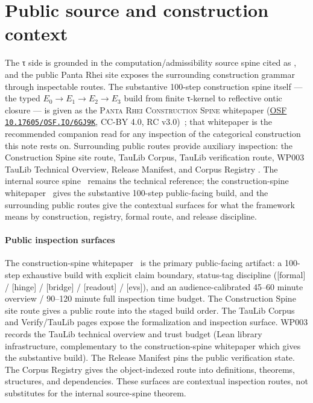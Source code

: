 \documentclass{pantarhei-researchnote}
\newcommand{\Ezero}{\ensuremath{E_0}}
\newcommand{\Eone}{\ensuremath{E_1}}
\newcommand{\Etwo}{\ensuremath{E_2}}
\newcommand{\Ethree}{\ensuremath{E_3}}
\begin{document}
\section{Public source and construction context}
\label{sec:public-context}

The τ side is grounded in the computation/admissibility source spine
cited as \cite{PR-III}, and the public Panta Rhei site exposes the
surrounding construction grammar through inspectable routes. The
substantive 100-step construction spine itself --- the typed
$\Ezero\to\Eone\to\Etwo\to\Ethree$ build from finite τ-kernel to
reflective ontic closure --- is given as the
\textsc{Panta Rhei Construction Spine} whitepaper
(\href{https://doi.org/10.17605/OSF.IO/6GJ9K}{OSF
\texttt{10.17605/OSF.IO/6GJ9K}}, CC-BY 4.0,
RC v3.0)~\cite{PR-ConstructionSpineWhitepaper}; that whitepaper is the
recommended companion read for any inspection of the categorical
construction this note rests on. Surrounding public routes provide
auxiliary inspection: the Construction Spine site route, TauLib Corpus,
TauLib verification route, WP003 TauLib Technical Overview, Release
Manifest, and Corpus Registry
\cite{PR-ConstructionSpinePublic,PR-TauLibCorpusPublic,PR-TauLibVerifyPublic,PR-TauLibWhitePaperPublic,PR-ReleaseManifestPublic,PR-RegistryPublic}.
The internal source spine~\cite{PR-III} remains the technical reference;
the construction-spine whitepaper~\cite{PR-ConstructionSpineWhitepaper}
gives the substantive 100-step public-facing build, and the surrounding
public routes give the contextual surfaces for what the framework means
by construction, registry, formal route, and release discipline.

\paragraph{Public inspection surfaces}
The construction-spine whitepaper~\cite{PR-ConstructionSpineWhitepaper}
is the primary public-facing artifact: a 100-step exhaustive build with
explicit claim boundary, status-tag discipline ([formal] / [hinge] /
[bridge] / [readout] / [evs]), and an audience-calibrated 45--60 minute
overview / 90--120 minute full inspection time budget. The Construction
Spine site route gives a public route into the staged build order. The
TauLib Corpus and Verify/TauLib pages expose the formalization and
inspection surface. WP003 records the TauLib technical overview and
trust budget (Lean library infrastructure, complementary to the
construction-spine whitepaper which gives the substantive build). The
Release Manifest pins the public verification state. The Corpus
Registry gives the object-indexed route into definitions, theorems,
structures, and dependencies. These surfaces are contextual inspection
routes, not substitutes for the internal source-spine theorem.
\end{document}
